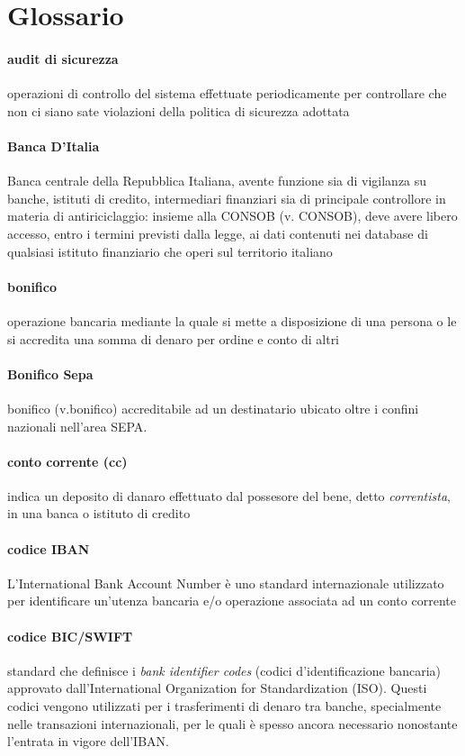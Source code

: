 \section{Glossario}

\paragraph{audit di sicurezza} 
	operazioni di controllo del sistema effettuate periodicamente per controllare che non ci siano sate violazioni della politica di sicurezza adottata
\paragraph{Banca D'Italia}
	 Banca centrale della Repubblica Italiana, avente funzione sia di vigilanza su banche, istituti di credito, intermediari finanziari sia di principale controllore in materia di antiriciclaggio: insieme alla CONSOB (v. CONSOB), deve avere libero accesso, entro i termini previsti dalla legge, ai dati contenuti nei database di qualsiasi istituto finanziario che operi sul territorio italiano 
\paragraph{bonifico}     
	operazione bancaria mediante la quale si mette a disposizione di una persona o le si accredita una somma di denaro per ordine e conto di altri
\paragraph{Bonifico Sepa}
	bonifico (v.bonifico) accreditabile ad un destinatario ubicato oltre i confini nazionali nell'area SEPA.
\paragraph{conto corrente (cc)}
	indica un deposito di danaro effettuato dal possesore del bene, detto \emph{correntista}, in una banca o istituto di credito
\paragraph{codice IBAN}
	L'International Bank Account Number è uno standard internazionale utilizzato per identificare un'utenza bancaria e/o operazione associata ad un conto corrente 

\paragraph{codice BIC/SWIFT}
	standard che definisce i \emph{bank identifier codes} (codici d'identificazione bancaria) approvato dall'International Organization for Standardization (ISO). Questi codici vengono utilizzati per i trasferimenti di denaro tra banche, specialmente nelle transazioni internazionali, per le quali è spesso ancora necessario nonostante l'entrata in vigore dell'IBAN. %

